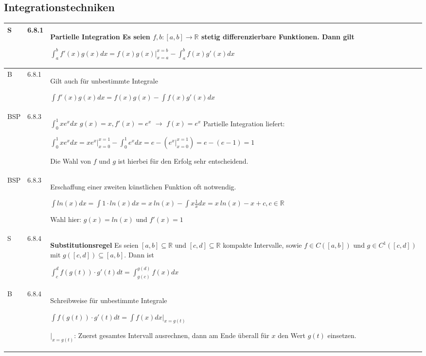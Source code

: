 \subsection{Integrationstechniken}

    \begin{longtable}{p{0.75cm} p{1cm} p{16cm}}
        \toprule

        S   & 6.8.1 &   \textbf{Partielle Integration} \hfill \break
                        Es seien $f,b :[a,b] \rightarrow \mathbb{R}$ stetig differenzierbare Funktionen. Dann gilt \hfill \break
                        \centerline{$ \int_a^b f'(x) g(x) dx = f(x) g(x) \vert_{x=a}^{x=b} - \int_a^b f(x) g'(x) dx $} \\
        \midrule
        B   & 6.8.1 &   Gilt auch für unbestimmte Integrale \hfill \break
                        \centerline{$ \int f'(x)g(x)dx = f(x) g(x) - \int f(x)g'(x) dx$} \\
        \midrule
                BSP & 6.8.3 &   $\int_0^1 x e^x dx$ \hfill \break
                        $g(x) = x, f'(x) = e^x$ $\rightarrow$ $f(x) = e^x$ \hfill \break
                        Partielle Integration liefert: \hfill \break
                        \centerline{$ \int_0^1 x e^x dx = xe^x \vert_{x=0}^{x=1} - \int_0^1 e^x dx = e- (e^x \vert_{x=0}^{x=1}) =
                        e- (e-1) = 1 $} \hfill \break
                        Die Wahl von $f$ und $g$ ist hierbei für den Erfolg sehr entscheidend. \\
        \midrule
        BSP & 6.8.3 &   Erschaffung einer zweiten künstlichen Funktion oft notwendig. \hfill \break
                        \centerline{$\int ln(x) dx = \int 1 \cdot ln(x) dx= x~ln(x) - \int x\frac{1}{x}dx = x~ln(x) - x + c, c \in \mathbb{R}$}
                        Wahl hier: $g(x) = ln(x)$ und $f'(x) = 1$ \\
        \midrule
        S   & 6.8.4 &   \textbf{Substitutionsregel} \hfill \break
                        Es seien $[a,b] \subseteq \mathbb{R}$ und $[c,d] \subseteq \mathbb{R}$ kompakte Intervalle, sowie $f \in C([a,b])$ und 
                        $g \in C^1([c,d])$ mit $g([c,d]) \subseteq [a,b]$. Dann ist \hfill \break
                        \centerline{$ \int_c^d f(g(t)) \cdot g'(t) dt = \int^{g(d)}_{g(c)} f(x) dx $} \\
        \midrule
        B   & 6.8.4 &   Schreibweise für unbestimmte Integrale \hfill \break
                        \centerline{$ \int f(g(t)) \cdot g'(t) dt = \int f(x) dx \vert_{x=g(t)}$}
                        $\vert_{x=g(t)}$: Zuerst gesamtes Intervall ausrechnen, dann am Ende überall für $x$ den Wert $g(t)$ einsetzen. \\   

\end{longtable}
